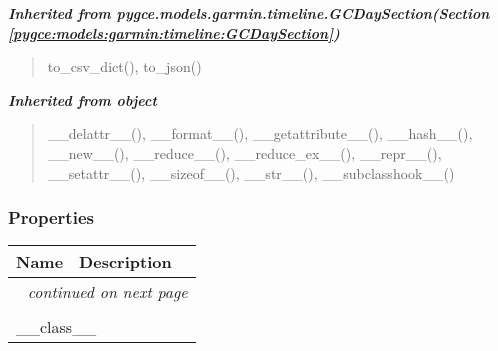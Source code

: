 \large{\textbf{\textit{Inherited from pygce.models.garmin.timeline.GCDaySection\textit{(Section \ref{pygce:models:garmin:timeline:GCDaySection})}}}}

\begin{quote}
to\_csv\_dict(), to\_json()
\end{quote}

\large{\textbf{\textit{Inherited from object}}}

\begin{quote}
\_\_delattr\_\_(), \_\_format\_\_(), \_\_getattribute\_\_(), \_\_hash\_\_(), \_\_new\_\_(), \_\_reduce\_\_(), \_\_reduce\_ex\_\_(), \_\_repr\_\_(), \_\_setattr\_\_(), \_\_sizeof\_\_(), \_\_str\_\_(), \_\_subclasshook\_\_()
\end{quote}


  \subsubsection{Properties}

    \vspace{-1cm}
\hspace{\varindent}\begin{longtable}{|p{\varnamewidth}|p{\vardescrwidth}|l}
\cline{1-2}
\cline{1-2} \centering \textbf{Name} & \centering \textbf{Description}& \\
\cline{1-2}
\endhead\cline{1-2}\multicolumn{3}{r}{\small\textit{continued on next page}}\\\endfoot\cline{1-2}
\endlastfoot\multicolumn{2}{|l|}{\textit{Inherited from object}}\\
\multicolumn{2}{|p{\varwidth}|}{\raggedright \_\_class\_\_}\\
\cline{1-2}
\end{longtable}



